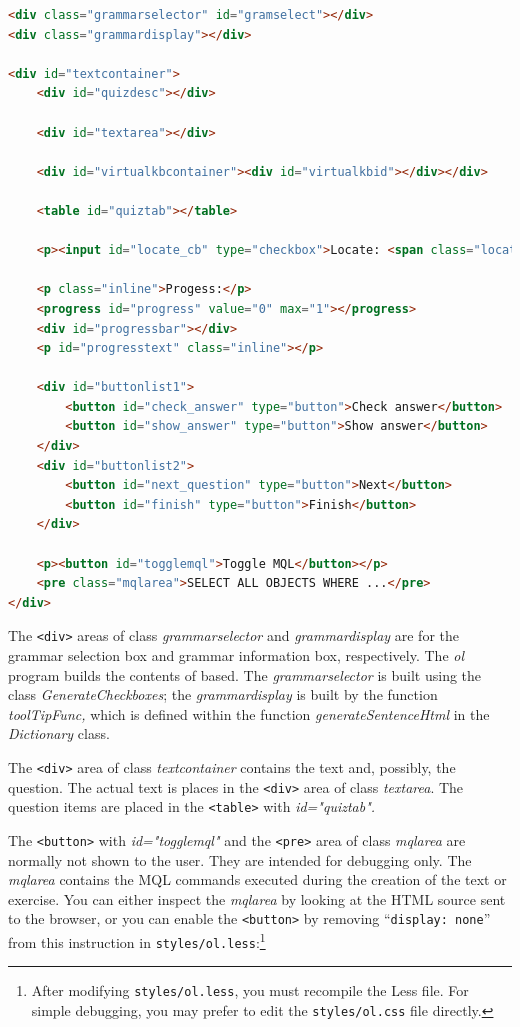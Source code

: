 \documentclass[11pt,oneside,a4paper]{memoir}
\newcommand*{\xml}[1]{\texttt{<#1>}}
\begin{document}
\begin{lstlisting}[language=HTML,morekeywords={progress}]
<div class="grammarselector" id="gramselect"></div>
<div class="grammardisplay"></div>
 
<div id="textcontainer">
    <div id="quizdesc"></div>
   
    <div id="textarea"></div>
 
    <div id="virtualkbcontainer"><div id="virtualkbid"></div></div>
  
    <table id="quiztab"></table>
  
    <p><input id="locate_cb" type="checkbox">Locate: <span class="location"></span></p>

    <p class="inline">Progess:</p>
    <progress id="progress" value="0" max="1"></progress>
    <div id="progressbar"></div>
    <p id="progresstext" class="inline"></p>

    <div id="buttonlist1">
        <button id="check_answer" type="button">Check answer</button>
        <button id="show_answer" type="button">Show answer</button>
    </div>
    <div id="buttonlist2">
        <button id="next_question" type="button">Next</button>
        <button id="finish" type="button">Finish</button>
    </div>

    <p><button id="togglemql">Toggle MQL</button></p>
    <pre class="mqlarea">SELECT ALL OBJECTS WHERE ...</pre>
</div>
\end{lstlisting}
  
The \xml{div} areas of class \emph{grammarselector} and \emph{grammardisplay} are for the grammar
selection box and grammar information box, respectively. The \emph{ol} program builds the contents
of based. The \emph{grammarselector} is built using the class \emph{GenerateCheckboxes}; the
\emph{grammardisplay} is built by the function \emph{toolTipFunc,} which is defined within the
function \emph{generateSentenceHtml} in the \emph{Dictionary} class.

The \xml{div} area of class \emph{textcontainer} contains the text and, possibly, the question. The
actual text is places in the \xml{div} area of class \emph{textarea}. The question items are placed
in the \xml{table} with \emph{id="quiztab".}

The \xml{button} with \emph{id="togglemql"} and the \xml{pre} area of class \emph{mqlarea} are
normally not shown to the user. They are intended for debugging only. The \emph{mqlarea} contains
the MQL commands executed during the creation of the text or exercise. You can either inspect the
\emph{mqlarea} by looking at the HTML source sent to the browser, or you can enable the \xml{button}
by removing ``\texttt{display:~none}'' from this instruction in
\texttt{styles/ol.less}:\footnote{After modifying \texttt{styles/ol.less}, you must recompile the
  Less file. For simple debugging, you may prefer to edit the \texttt{styles/ol.css} file directly.}
\end{document}
